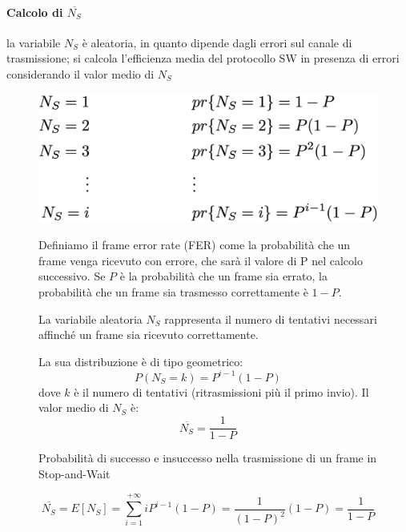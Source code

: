 \paragraph{Calcolo di $\overline{N_S}$}
la variabile $N_S$ è aleatoria, in quanto
dipende dagli errori sul canale di trasmissione; 
si calcola l'efficienza media del protocollo SW in presenza di errori considerando il valor
medio di $N_S$
\begin{figure}[htbp]
    \centering
    \begin{minipage}{0.45\textwidth}
        \includegraphics[width=\linewidth]{images/swprobabilita.png}
        \caption{Probabilità di successo e insuccesso nella trasmissione di un frame in Stop-and-Wait}
    \end{minipage}%
    \hfill
    \begin{minipage}{0.5\textwidth}
        Definiamo il frame error rate (FER) come la probabilità che un frame venga ricevuto con errore, che sarà il valore di P nel calcolo successivo. 
            Se $P$ è la probabilità che un frame sia errato, la probabilità che un frame sia trasmesso correttamente è $1-P$.
       
        La variabile aleatoria $N_S$ rappresenta il numero di tentativi necessari affinché un frame sia ricevuto correttamente. 
        
        La sua distribuzione è di tipo geometrico:
        \begin{equation*}
            P(N_S = k) = P^{i-1}(1-P)
        \end{equation*}
        dove $k$ è il numero di tentativi (ritrasmissioni più il primo invio).
        Il valor medio di $N_S$ è:
        \begin{equation*}
            \overline{N_S} = \frac{1}{1-P}
        \end{equation*}
    \end{minipage}
\end{figure}



\begin{equation*}
 \overline{N_S} = E[N_S] = \sum_{i=1}^{+\infty} i P^{i-1}(1-P) = \frac{1}{(1-P)^2}(1-P) = \frac{1}{1-P}
\end{equation*}

